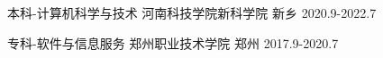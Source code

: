 

\begin{cventries}

  \cventry
    {本科-计算机科学与技术} %
    {河南科技学院新科学院} %
    {新乡} %
    {2020.9-2022.7} %
    {
      \begin{cvitems} %
         {}
      \end{cvitems}
    }
  \cventry
	{专科-软件与信息服务} %
	{郑州职业技术学院} %
	{郑州} %
	{2017.9-2020.7} %
	{
	\begin{cvitems} %
		{}
	\end{cvitems}
	}
\end{cventries}
